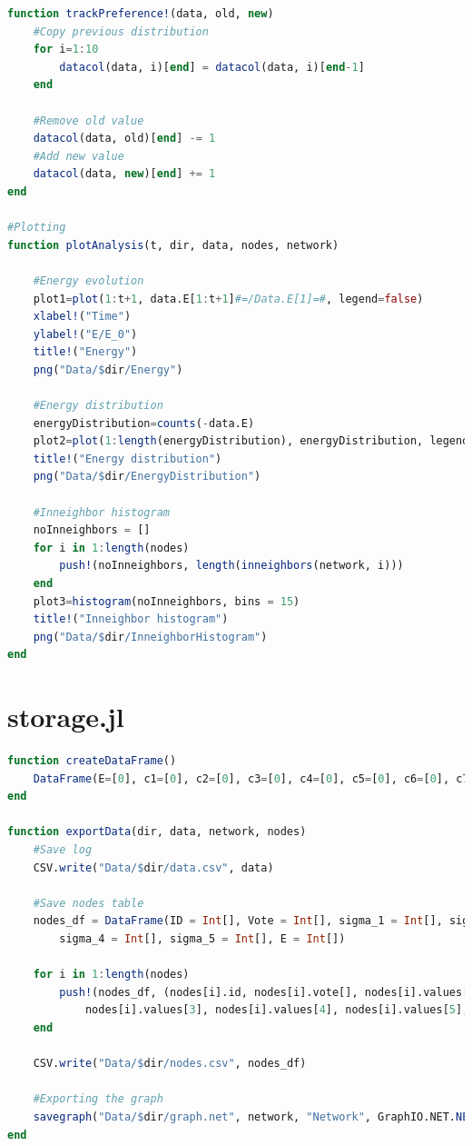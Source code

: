 \documentclass[12pt,openright,twoside]{book}
\begin{document}
\begin{appendices}
\begin{lstlisting}[language=julia]
function trackPreference!(data, old, new)
    #Copy previous distribution
    for i=1:10
        datacol(data, i)[end] = datacol(data, i)[end-1]
    end

    #Remove old value
    datacol(data, old)[end] -= 1
    #Add new value
    datacol(data, new)[end] += 1
end

#Plotting
function plotAnalysis(t, dir, data, nodes, network)

    #Energy evolution
    plot1=plot(1:t+1, data.E[1:t+1]#=/Data.E[1]=#, legend=false)
    xlabel!("Time")
    ylabel!("E/E_0")
    title!("Energy")
    png("Data/$dir/Energy")

    #Energy distribution
    energyDistribution=counts(-data.E)
    plot2=plot(1:length(energyDistribution), energyDistribution, legend=false)
    title!("Energy distribution")
    png("Data/$dir/EnergyDistribution")

    #Inneighbor histogram
    noInneighbors = []
    for i in 1:length(nodes)
        push!(noInneighbors, length(inneighbors(network, i)))
    end
    plot3=histogram(noInneighbors, bins = 15)
    title!("Inneighbor histogram")
    png("Data/$dir/InneighborHistogram")
end

\end{lstlisting}

\vspace{14pt}

\section{storage.jl}
\begin{lstlisting}[language=julia]
function createDataFrame()
    DataFrame(E=[0], c1=[0], c2=[0], c3=[0], c4=[0], c5=[0], c6=[0], c7=[0], c8=[0], c9=[0], c10=[0])
end

function exportData(dir, data, network, nodes) 
    #Save log
    CSV.write("Data/$dir/data.csv", data)

    #Save nodes table
    nodes_df = DataFrame(ID = Int[], Vote = Int[], sigma_1 = Int[], sigma_2 = Int[], sigma_3 = Int[], 
        sigma_4 = Int[], sigma_5 = Int[], E = Int[])
    
    for i in 1:length(nodes)
        push!(nodes_df, (nodes[i].id, nodes[i].vote[], nodes[i].values[1], nodes[i].values[2], 
            nodes[i].values[3], nodes[i].values[4], nodes[i].values[5], nodes[i].energy[]))
    end

    CSV.write("Data/$dir/nodes.csv", nodes_df)

    #Exporting the graph
    savegraph("Data/$dir/graph.net", network, "Network", GraphIO.NET.NETFormat())
end


\end{lstlisting}
\end{appendices}
\end{document}
